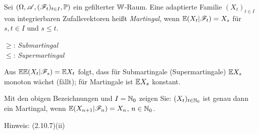 \begin{defn}
  Sei $(\Omega, \mathscr{A}, (\mathscr{F}_t)_{t \in I}, \mathbb{P})$ ein gefilterter $\mathbb{W}$-Raum. Eine
  adaptierte Familie $(X_t)_{t \in I}$ von integrierbaren Zufallsvektoren heißt
  \emph{Martingal}, wenn $\mathbb{E}(X_t | \mathscr{F}_t) = X_s$ für $s,t \in I$ und $s \le t$.

  $\ge$: \emph{Submartingal} \\
  $\le$: \emph{Supermartingal}
\end{defn}

\begin{rmrk}
  Aus $\mathbb{E} \mathbb{E}( X_t | \mathscr{F}_s ) = \mathbb{E} X_t$ folgt, dass für Submartingale
  (Supermartingale) $\mathbb{E} X_s$ monoton wächst (fällt); für Martingale ist $\mathbb{E}
  X_s$ konstant.
\end{rmrk}

\begin{prgp}[Aufgabe] Mit den obigen Bezeichnungen und $I = \mathbb{N}_0$ zeigen Sie:
  $(X_t)_{t \in \mathbb{N}_0}$ ist genau dann ein Martingal, wenn $\mathbb{E}(X_{n+1} |
  \mathscr{F}_n) = X_n$, $n \in \mathbb{N}_0$.

  Hinweis: (2.10.7)(ii)
\end{prgp}

